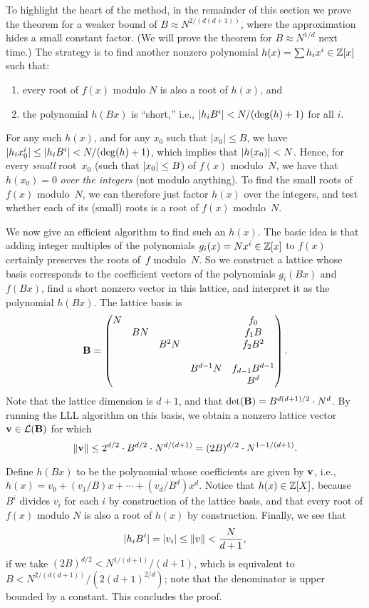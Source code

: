 \documentclass[11pt]{article}
\begin{document}
To highlight the heart of the method, in the remainder of this section
we prove the theorem for a weaker bound of $B \approx N^{2/(d(d+1))}$,
where the approximation hides a small constant factor. (We will prove
the theorem for $B \approx N^{1/d}$ next time.) The strategy is to
find another nonzero polynomial $h(x) = \sum h_{i} x^{i} \in \mathbb{Z}[x]$
such that:
\begin{enumerate}[itemsep=0pt]
\item every root of $f(x)$ modulo $N$ is also a root of $h(x)$, and
\item the polynomial $h(Bx)$ is ``short,'' i.e.,
  $\lvert h_{i} B^{i}\rvert < N/(\deg(h)+1)$ for all $i$.
\end{enumerate}
For any such $h(x)$, and for any $x_{0}$ such that $|x_0| \leq B$, we
have $\lvert h_i x_0^i\rvert \leq \lvert h_{i} B^{i}\rvert < N/(\deg(h)+1)$, which
implies that $\lvert h(x_0)\rvert < N$. Hence, for every \emph{small}
root~$x_0$ (such that $\lvert x_{0}\rvert \leq B$) of $f(x)$ modulo~$N$, we
have that $h(x_0)=0$ \emph{over the integers} (not modulo anything).
To find the small roots of $f(x)$ modulo~$N$, we can therefore just
factor $h(x)$ over the integers, and test whether each of its (small)
roots is a root of $f(x)$ modulo~$N$.

We now give an efficient algorithm to find such an $h(x)$. The basic
idea is that adding integer multiples of the polynomials
$g_{i}(x) = N x^i \in \mathbb{Z}[x]$ to $f(x)$ certainly preserves the roots
of~$f$ modulo~$N$. So we construct a lattice whose basis corresponds
to the coefficient vectors of the polynomials $g_{i}(Bx)$ and $f(Bx)$,
find a short nonzero vector in this lattice, and interpret it as the
polynomial $h(Bx)$. The lattice basis is
\[ \mathbf{B} =
  \begin{pmatrix}
    N & & & & f_0 \\
      & B N & & & f_1 B \\
      & & B^2 N & & f_2 B^2   \\
      & & & & \\
      & & & B^{d-1} N & f_{d-1} B^{d-1} \\
      & & & & B^d
  \end{pmatrix}. \]
Note that the lattice dimension is $d+1$, and that
$\det(\mathbf{B}) = B^{d(d+1)/2} \cdot N^d$. By running the LLL algorithm
on this basis, we obtain a nonzero lattice vector~$\mathbf{v} \in
\mathcal{L}(\mathbf{B})$ for which
\[ \lVert\mathbf{v}\rVert \leq 2^{d/2} \cdot B^{d/2} \cdot N^{d/(d+1)} =
  (2B)^{d/2} \cdot N^{1-1/(d+1)}.
\]

Define $h(Bx)$ to be the polynomial whose coefficients are given by
$\mathbf{v}$, i.e., $h(x) = v_0 + (v_{1}/B)x + \cdots + (v_{d}/B^{d}) x^d$.
Notice that $h(x) \in \mathbb{Z}[X]$, because $B^i$ divides $v_i$ for each $i$
by construction of the lattice basis, and that every root of $f(x)$
modulo $N$ is also a root of $h(x)$ by construction. Finally, we see
that
\[ \lvert h_{i} B^{i} \rvert = \lvert v_{i}\rvert \leq \lVert v\rVert <
  \frac{N}{d+1}, \] if we take $(2B)^{d/2} < N^{1/(d+1)}/(d+1)$, which
is equivalent to $B < N^{2/(d(d+1))}/(2 (d+1)^{2/d})$; note that the
denominator is upper bounded by a constant. This concludes the proof.



\end{document}
